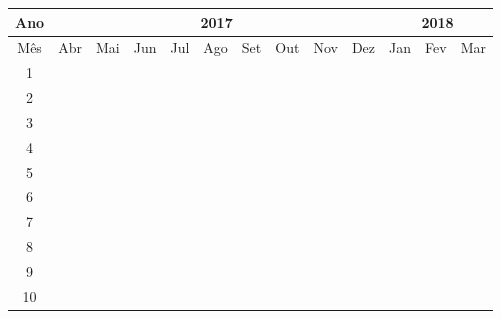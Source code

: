 \begin{tabular}{c|c|c|c|c|c|c|c|c|c|c|c|c} \hline
	Ano & \multicolumn{9}{|c|}{2017} & \multicolumn{3}{|c}{2018} \\ \hline
	Mês & Abr & Mai & Jun & Jul & Ago & Set & Out & Nov & Dez & Jan & Fev & Mar \\ \hline
	1   & \tf &     &     &     &     &     &     &     &     &     &     &     \\ \hline
	2   & \tf & \tf & \tf &     &     &     &     &     &     &     &     &     \\ \hline
	3   &     &     & \tp & \tp & \tp &     &     &     &     &     &     &     \\ \hline
	4   &     &     &     &     & \tn &     &     &     &     &     &     &     \\ \hline
	5   &     &     &     &     &     & \tf &     &     &     &     &     &     \\ \hline
	6   &     &     &     &     &     & \tn & \tn & \tn & \tn & \tn &     &     \\ \hline
	7   &     &     &     &     &     &     & \tn & \tn & \tn & \tn &     &     \\ \hline	
	8   &     &     &     &     &     &     & \tn & \tn &     & \tn & \tn &     \\ \hline	
	9   &     &     &     &     &     &     & \tn & \tn & \tn & \tn & \tn &     \\ \hline
	10  &     &     &     &     &     &     &     &     &     &     &     & \tn \\ \hline		
\end{tabular}